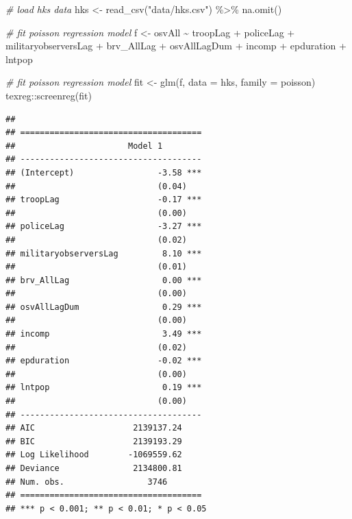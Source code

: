 \documentclass[
]{book}
\newenvironment{Shaded}{\begin{snugshade}}{\end{snugshade}}
\newcommand{\AttributeTok}[1]{\textcolor[rgb]{0.77,0.63,0.00}{#1}}
\newcommand{\CommentTok}[1]{\textcolor[rgb]{0.56,0.35,0.01}{\textit{#1}}}
\newcommand{\FunctionTok}[1]{\textcolor[rgb]{0.00,0.00,0.00}{#1}}
\newcommand{\NormalTok}[1]{#1}
\newcommand{\OtherTok}[1]{\textcolor[rgb]{0.56,0.35,0.01}{#1}}
\newcommand{\SpecialCharTok}[1]{\textcolor[rgb]{0.00,0.00,0.00}{#1}}
\newcommand{\StringTok}[1]{\textcolor[rgb]{0.31,0.60,0.02}{#1}}
\begin{document}
\begin{Shaded}
\begin{Highlighting}[]
\CommentTok{\# load hks data}
\NormalTok{hks }\OtherTok{\textless{}{-}} \FunctionTok{read\_csv}\NormalTok{(}\StringTok{"data/hks.csv"}\NormalTok{) }\SpecialCharTok{\%\textgreater{}\%}
  \FunctionTok{na.omit}\NormalTok{()}

\CommentTok{\# fit poisson regression model}
\NormalTok{f }\OtherTok{\textless{}{-}}\NormalTok{ osvAll }\SpecialCharTok{\textasciitilde{}}\NormalTok{ troopLag }\SpecialCharTok{+}\NormalTok{ policeLag }\SpecialCharTok{+}\NormalTok{ militaryobserversLag }\SpecialCharTok{+} 
\NormalTok{  brv\_AllLag }\SpecialCharTok{+}\NormalTok{ osvAllLagDum }\SpecialCharTok{+}\NormalTok{ incomp }\SpecialCharTok{+}\NormalTok{ epduration }\SpecialCharTok{+} 
\NormalTok{  lntpop}

\CommentTok{\# fit poisson regression model}
\NormalTok{fit }\OtherTok{\textless{}{-}} \FunctionTok{glm}\NormalTok{(f, }\AttributeTok{data =}\NormalTok{ hks, }\AttributeTok{family =}\NormalTok{ poisson)}
\NormalTok{texreg}\SpecialCharTok{::}\FunctionTok{screenreg}\NormalTok{(fit)}
\end{Highlighting}
\end{Shaded}

\begin{verbatim}
## 
## =====================================
##                       Model 1        
## -------------------------------------
## (Intercept)                 -3.58 ***
##                             (0.04)   
## troopLag                    -0.17 ***
##                             (0.00)   
## policeLag                   -3.27 ***
##                             (0.02)   
## militaryobserversLag         8.10 ***
##                             (0.01)   
## brv_AllLag                   0.00 ***
##                             (0.00)   
## osvAllLagDum                 0.29 ***
##                             (0.00)   
## incomp                       3.49 ***
##                             (0.02)   
## epduration                  -0.02 ***
##                             (0.00)   
## lntpop                       0.19 ***
##                             (0.00)   
## -------------------------------------
## AIC                    2139137.24    
## BIC                    2139193.29    
## Log Likelihood        -1069559.62    
## Deviance               2134800.81    
## Num. obs.                 3746       
## =====================================
## *** p < 0.001; ** p < 0.01; * p < 0.05
\end{verbatim}
\end{document}
